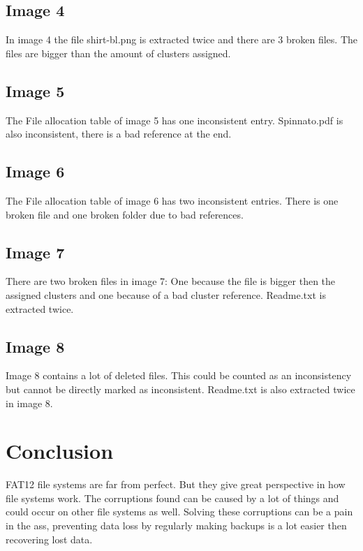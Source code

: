 \documentclass[pdftex,12pt,a4paper]{article}
\begin{document}
\subsection{Image 4}
In image 4 the file shirt-bl.png is extracted twice and there are 3 broken files. The files are bigger than the amount of clusters assigned. 
\subsection{Image 5}
The File allocation table of image 5 has one inconsistent entry.
Spinnato.pdf is also inconsistent, there is a bad reference at the end.
\subsection{Image 6}
The File allocation table of image 6 has two inconsistent entries. There is one broken file and one broken folder due to bad references.
\subsection{Image 7}
There are two broken files in image 7: One because the file is bigger then the assigned clusters and one because of a bad cluster reference. Readme.txt is extracted twice.
\subsection{Image 8}
Image 8 contains a lot of deleted files. This could be counted as an inconsistency but cannot be directly marked as inconsistent. Readme.txt is also extracted twice in image 8. 

\section{Conclusion}
FAT12 file systems are far from perfect. But they give great perspective in how file systems work. The corruptions found can be caused by a lot of things and could occur on other file systems as well. Solving these corruptions can be a pain in the ass, preventing data loss by regularly making backups is a lot easier then recovering lost data. 
\end{document}
